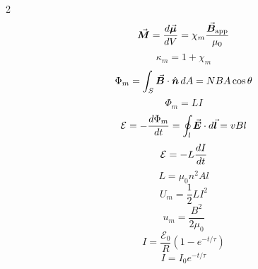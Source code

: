 \begin{multicols*}{2}
\begin{equation*}
\end{equation*}
\begin{equation*}
    \vec{\bm{M}} = \frac{d \vec{\bm{\mu}}}{d V} = \chi_m \frac{\vec{\bm{B}}_\mathrm{app}}{\mu_0}
\end{equation*}
\begin{equation*}
    \kappa_m = 1 + \chi_m
\end{equation*}
\begin{equation*}
    \Phi_m = \int_S \vec{\bm{B}}\cdot\hat{\bm{n}}\,dA = N B A \cos\theta
\end{equation*}
\begin{equation*}
    \Phi_m = LI
\end{equation*}
\begin{equation*}
    \mathcal{E} = - \frac{d \Phi_m}{d t} = \oint_l \vec{\bm{E}}\cdot d\vec{\bm{l}} = v B l
\end{equation*}
\begin{equation*}
    \mathcal{E} = -L \frac{d I}{d t}
\end{equation*}
\begin{equation*}
    L = \mu_0 n^2 A l
\end{equation*}
\begin{equation*}
    U_m = \frac{1}{2}LI^2
\end{equation*}
\begin{equation*}
    u_m = \frac{B^2}{2\mu_0}
\end{equation*}
\begin{equation*}
    I = \frac{\mathcal{E}_0}{R} \left(1 - e^{-t/\tau}\right)
\end{equation*}
\begin{equation*}
    I = I_0 e^{-t/\tau}
\end{equation*}

\end{multicols*}